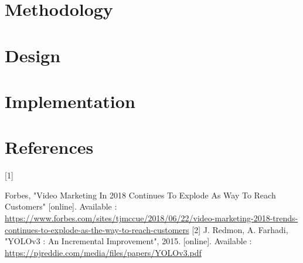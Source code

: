 \documentclass{article}
\begin{document}
\section{Methodology}

\section{Design}

\section{Implementation}

\newpage

\section{References}
\hypertarget{ref1}{[1]} Forbes, "Video Marketing In 2018 Continues To Explode As Way To Reach Customers" [online]. Available :  \href{https://www.forbes.com/sites/tjmccue/2018/06/22/video-marketing-2018-trends-continues-to-explode-as-the-way-to-reach-customers}{https://www.forbes.com/sites/tjmccue/2018/06/22/video-marketing-2018-trends-continues-to-explode-as-the-way-to-reach-customers}
\newline
\hypertarget{ref2}{[2]} J. Redmon, A. Farhadi, "YOLOv3 : An Incremental Improvement", 2015. [online]. Available :  \url{https://pjreddie.com/media/files/papers/YOLOv3.pdf}
\end{document}
